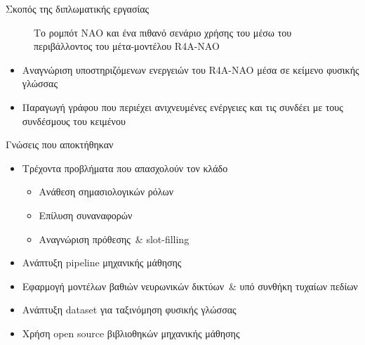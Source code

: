 \documentclass{beamer}
\def\textenglish{}
\newcommand{\en}[1]{\textenglish{#1}}
\newcommand{\metamodel}{\en{R4A-NAO}}
\begin{document}
\begin{frame}{Σκοπός της διπλωματικής εργασίας}
\begin{figure}
        \caption{Το ρομπότ NAO και ένα πιθανό σενάριο χρήσης του μέσω του περιβάλλοντος του μέτα-μοντέλου \metamodel{}}
    \end{figure}
    \begin{itemize}
        \item Αναγνώριση υποστηριζόμενων ενεργειών του \metamodel{} μέσα σε κείμενο φυσικής γλώσσας
        \item Παραγωγή γράφου που περιέχει ανιχνευμένες ενέργειες και τις συνδέει με τους συνδέσμους του κειμένου
    \end{itemize}
\end{frame}

\begin{frame}{Γνώσεις που αποκτήθηκαν}
    \begin{itemize}
        \item Τρέχοντα προβλήματα που απασχολούν τον κλάδο
              \begin{itemize}
                  \item Ανάθεση σημασιολογικών ρόλων
                  \item Επίλυση συναναφορών
                  \item Αναγνώριση πρόθεσης~\& \en{slot-filling}
              \end{itemize}
        \item Ανάπτυξη \en{pipeline} μηχανικής μάθησης
        \item Εφαρμογή μοντέλων βαθιών νευρωνικών δικτύων~\& υπό συνθήκη τυχαίων πεδίων
        \item Ανάπτυξη dataset για ταξινόμηση φυσικής γλώσσας
        \item Χρήση open source βιβλιοθηκών μηχανικής μάθησης
    \end{itemize}
\end{frame}
\end{document}
